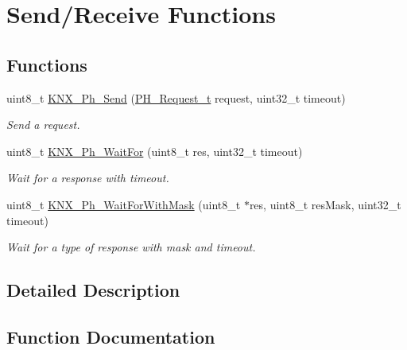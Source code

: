 \hypertarget{group___k_n_x___p_h___sup___exported___functions___group2}{}\section{Send/\+Receive Functions}
\label{group___k_n_x___p_h___sup___exported___functions___group2}
\subsection*{Functions}
\begin{DoxyCompactItemize}
\item 
uint8\+\_\+t \hyperlink{group___k_n_x___p_h___sup___exported___functions___group2_gad47b9ae30f2704001cf07d31da372fe2}{K\+N\+X\+\_\+\+Ph\+\_\+\+Send} (\hyperlink{group___k_n_x___p_h___sup___exported___types_ga78f5bed722457f025cbc6786d5730d3e}{P\+H\+\_\+\+Request\+\_\+t} request, uint32\+\_\+t timeout)
\begin{DoxyCompactList}\small\item\em Send a request. \end{DoxyCompactList}\item 
uint8\+\_\+t \hyperlink{group___k_n_x___p_h___sup___exported___functions___group2_ga5c5b1af8b0ba06771d5b16fee4547f87}{K\+N\+X\+\_\+\+Ph\+\_\+\+Wait\+For} (uint8\+\_\+t res, uint32\+\_\+t timeout)
\begin{DoxyCompactList}\small\item\em Wait for a response with timeout. \end{DoxyCompactList}\item 
uint8\+\_\+t \hyperlink{group___k_n_x___p_h___sup___exported___functions___group2_ga4bede9df3610d29290973ac067ac93ae}{K\+N\+X\+\_\+\+Ph\+\_\+\+Wait\+For\+With\+Mask} (uint8\+\_\+t $\ast$res, uint8\+\_\+t res\+Mask, uint32\+\_\+t timeout)
\begin{DoxyCompactList}\small\item\em Wait for a type of response with mask and timeout. \end{DoxyCompactList}\end{DoxyCompactItemize}


\subsection{Detailed Description}


\subsection{Function Documentation}
